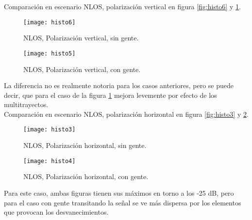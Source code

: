 \documentclass[12pt]{article}
\begin{document}
\normalsize
Comparación en escenario NLOS, polarización vertical en figura \ref{fig:histo6} y \ref{fig:histo5}.
\begin{figure}[H]
\hfill
\begin{minipage}[t]{.45\textwidth}
  \centering
        \texttt{[image: histo6]}
		\caption{\footnotesize NLOS, Polarización vertical, sin gente.}
\label{fig:histo6}
\end{minipage}
\hfill
\begin{minipage}[t]{.45\textwidth}
  \centering
        \texttt{[image: histo5]}
		\caption{\footnotesize NLOS, Polarización vertical, con gente.}
\label{fig:histo5}
\end{minipage}
\end{figure}
\footnotesize
La diferencia no es realmente notoria para los casos anteriores, pero se puede decir, que para el 
caso de la figura \ref{fig:histo5} mejora levemente por efecto de los multitrayectos.\\
\newpage
\normalsize
Comparación en escenario NLOS, polarización horizontal en figura \ref{fig:histo3} y \ref{fig:histo4}.
\begin{figure}[H]
\hfill
\begin{minipage}[t]{.45\textwidth}
  \centering
        \texttt{[image: histo3]}
		\caption{\footnotesize NLOS, Polarización horizontal, sin gente.}
\label{fig:histo3}
\end{minipage}
\hfill
\begin{minipage}[t]{.45\textwidth}
  \centering
        \texttt{[image: histo4]}
		\caption{\footnotesize NLOS, Polarización horizontal, con gente.}
\label{fig:histo4}
\end{minipage}
\end{figure}
\footnotesize
Para este caso, ambas figuras tienen sus máximos en torno a los -25 dB, pero para el caso
con gente transitando la señal se ve más dispersa por los elementos que provocan los 
desvanecimientos.\\
\end{document}
